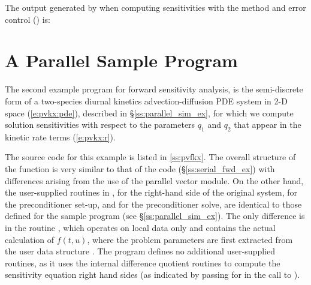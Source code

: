 The output generated by  when computing sensitivities with the 
method and  error control () is:
{\small}


\section{A Parallel Sample Program}\label{ss:parallel_fwd_ex}

The second example program for forward sensitivity analysis,  is the
semi-discrete form of a two-species diurnal kinetics advection-diffusion PDE 
system in 2-D space (\ref{e:pvkx:pde}), described in \S\ref{ss:parallel_sim_ex}, 
for which we compute solution sensitivities with respect to the parameters $q_1$ 
and $q_2$ that appear in the kinetic rate terms (\ref{e:pvkx:r}).

The source code for this example is listed in \A\ref{ss:pvfkx}.
The overall structure of the  function is very
similar to that of the code  (\S\ref{ss:serial_fwd_ex}) with 
differences arising from the use of the parallel vector module.
On the other hand, the user-supplied routines in ,
 for the right-hand side of the original system,
 for the preconditioner set-up, and  for the
preconditioner solve, are identical to those defined for the sample program
 (see \S\ref{ss:parallel_sim_ex}). The only difference is in the
routine , which operates on local data only and contains the actual 
calculation of $f(t,u)$, where the problem parameters are first extracted from
the user data structure . The program  defines no additional
user-supplied routines, as it uses the {\cvodes} internal difference quotient routines 
to compute the sensitivity equation right hand sides (as indicated by passing
 for  in the call to ).

